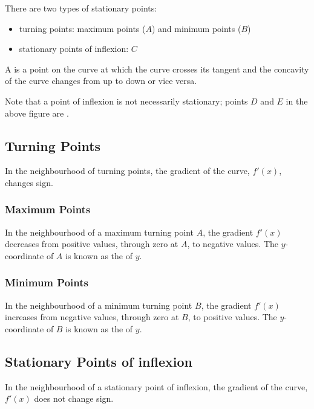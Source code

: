 There are two types of stationary points:
\begin{itemize}
    \item turning points: maximum points ($A$) and minimum points ($B$)
    \item stationary points of inflexion: $C$
\end{itemize}

\begin{definition}
    A  is a point on the curve at which the curve crosses its tangent and the concavity of the curve changes from up to down or vice versa.
\end{definition}

Note that a point of inflexion is not necessarily stationary; points $D$ and $E$ in the above figure are . 

\subsection{Turning Points}

In the neighbourhood of turning points, the gradient of the curve, $f'(x)$, changes sign.

\subsubsection{Maximum Points}

In the neighbourhood of a maximum turning point $A$, the gradient $f'(x)$ decreases from positive values, through zero at $A$, to negative values. The $y$-coordinate of $A$ is known as the  of $y$.

\subsubsection{Minimum Points}

In the neighbourhood of a minimum turning point $B$, the gradient $f'(x)$ increases from negative values, through zero at $B$, to positive values. The $y$-coordinate of $B$ is known as the  of $y$.

\subsection{Stationary Points of inflexion}

In the neighbourhood of a stationary point of inflexion, the gradient of the curve, $f'(x)$ does not change sign.

